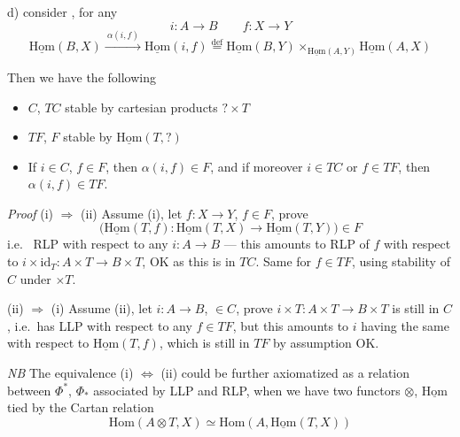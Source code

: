 \documentclass[11pt,a4paper]{article}
\begin{document}
d)  consider , for
any
\[
  i : A \to B \qquad f : X \to Y
\]
\[
  \underline{\mathrm{Hom}}(B, X) \xrightarrow{\ \alpha(i,f)\ }
  \underline{\mathrm{Hom}}(i, f) \overset{\mathrm{def}}{=}
  \underline{\mathrm{Hom}}(B, Y)
  \times_{\underline{\mathrm{Hom}}(A, Y)}
  \underline{\mathrm{Hom}}(A, X)
\]

 Then we have the following
\begin{itemize}
  \item[(i)] $C$, $TC$ stable by cartesian products $? \times T$
  \item[(ii)] $TF$, $F$ stable by $\underline{\mathrm{Hom}}(T, ?)$
  \item[(iii)] If $i \in C$, $f \in F$, then $\alpha(i,f) \in F$, and if
  moreover $i \in TC$ or $f \in TF$, then $\alpha(i,f) \in TF$.
\end{itemize}

\emph{Proof} (i) $\Rightarrow$ (ii) Assume (i), let $f : X \to Y$,
$f \in F$, prove 
\[
  \bigl( \underline{\mathrm{Hom}}(T, f) : \underline{\mathrm{Hom}}(T, X)
  \to \underline{\mathrm{Hom}}(T, Y) \bigr) \in F
\]
i.e.\  RLP with respect to any $i : A \to B$  —
this amounts to RLP of $f$ with respect to
$i \times \mathrm{id}_T : A \times T \to B \times T$, OK as this is
 in $TC$. Same for $f \in TF$, using stability of $C$ under
$\times T$.

(ii) $\Rightarrow$ (i) Assume (ii), let $i : A \to B$, 
$\in C$, prove $i \times T : A \times T \to B \times T$ is still in $C$,
i.e.\ has  LLP with respect to any $f \in TF$, but this
amounts to $i$ having the same with respect to
$\underline{\mathrm{Hom}}(T, f)$, which is still in $TF$ by assumption OK.

 \emph{NB} The equivalence
(i) $\Leftrightarrow$ (ii) could be further axiomatized as a relation
between $\Phi^*$, $\Phi_*$ associated by LLP and RLP, when we have two
functors $\otimes$, $\underline{\mathrm{Hom}}$ tied by the Cartan relation
\[
  \mathrm{Hom}(A \otimes T, X) \simeq
  \mathrm{Hom}(A, \underline{\mathrm{Hom}}(T, X))
\]
\end{document}
